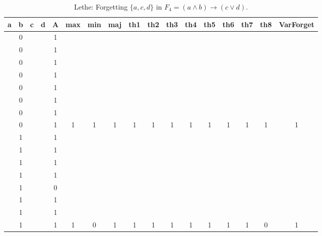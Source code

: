 \begin{table}[!tb]
    \centering
    \begin{tabular}{|c|c|c|c|c|c|c|c|c|c|c|c|c|c|c|c|c|}
        \hline
        \textbf{a} & \textbf{b} & \textbf{c} & \textbf{d} & \textbf{A} & \textbf{max} & \textbf{min} & \textbf{maj} & \textbf{th1} & \textbf{th2} & \textbf{th3} & \textbf{th4} & \textbf{th5} & \textbf{th6} & \textbf{th7} & \textbf{th8} & \textbf{VarForget} \\ \hline
        \rowcolor{gray!40}  & 0 &  &  & 1 &  &  &  &  &  &  &  &  &  &  &  &  \\ \hline
        \rowcolor{gray!40}  & 0 &  &  & 1 &  &  &  &  &  &  &  &  &  &  &  &  \\ \hline
        \rowcolor{gray!40}  & 0 &  &  & 1 &  &  &  &  &  &  &  &  &  &  &  &  \\ \hline
        \rowcolor{gray!40}  & 0 &  &  & 1 &  &  &  &  &  &  &  &  &  &  &  &  \\ \hline
        \rowcolor{gray!40}  & 0 &  &  & 1 &  &  &  &  &  &  &  &  &  &  &  &  \\ \hline
        \rowcolor{gray!40}  & 0 &  &  & 1 &  &  &  &  &  &  &  &  &  &  &  &  \\ \hline
        \rowcolor{gray!40}  & 0 &  &  & 1 &  &  &  &  &  &  &  &  &  &  &  &  \\ \hline
        \rowcolor{gray!40}  & 0 &  &  & 1 & 1 & 1 & 1 & 1 & 1 & 1 & 1 & 1 & 1 & 1 & 1 & 1 \\ \hline
        \rowcolor{blue!40}  & 1 &  &  & 1 &  &  &  &  &  &  &  &  &  &  &  &  \\ \hline
        \rowcolor{blue!40}  & 1 &  &  & 1 &  &  &  &  &  &  &  &  &  &  &  &  \\ \hline
        \rowcolor{blue!40}  & 1 &  &  & 1 &  &  &  &  &  &  &  &  &  &  &  &  \\ \hline
        \rowcolor{blue!40}  & 1 &  &  & 1 &  &  &  &  &  &  &  &  &  &  &  &  \\ \hline
        \rowcolor{blue!40}  & 1 &  &  & 0 &  &  &  &  &  &  &  &  &  &  &  &  \\ \hline
        \rowcolor{blue!40}  & 1 &  &  & 1 &  &  &  &  &  &  &  &  &  &  &  &  \\ \hline
        \rowcolor{blue!40}  & 1 &  &  & 1 &  &  &  &  &  &  &  &  &  &  &  &  \\ \hline
        \rowcolor{blue!40}  & 1 &  &  & 1 & 1 & 0 & 1 & 1 & 1 & 1 & 1 & 1 & 1 & 1 & 0 & 1 \\ \hline
    \end{tabular}
    \caption{Lethe: Forgetting $\{a, c, d\}$ in $F_{4} = (a \land b) \rightarrow (c \lor d)$.}
    \label{tab:lethe-F4-acd}
\end{table}
